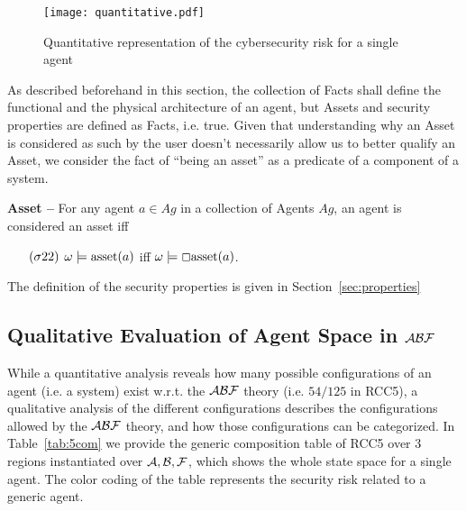 \begin{figure}[t]
	\centering
	\texttt{[image: quantitative.pdf]}
	\caption{Quantitative representation of the cybersecurity risk for a single agent}
	\label{fig:quantitative}
\end{figure}

As described beforehand in this section, the collection of Facts shall define
the functional and the physical architecture of an agent, but Assets and
security properties are defined as Facts, i.e. true. Given that understanding
why an Asset is considered as such by the user doesn't necessarily allow
us to better qualify an Asset, we consider the fact of ``being an asset'' as
a predicate of a component of a system. 

\begin{definition}{\bf Asset --}\label{def:asset}
For any agent $a\in Ag$ in a collection of Agents $Ag$, an agent is considered an asset iff 
	\begin{enumerate}[noitemsep]
		\item[$(\sigma22)$] $\omega\models\text{asset}({a})$ iff
			$\omega\models \Box\text{asset}({a})$.
	\end{enumerate}
\end{definition}

The definition of the security properties is given in Section~\ref{sec:properties}

\subsection{Qualitative Evaluation of Agent Space in $\mathcal{A}\mathcal{B}\mathcal{F}$}\label{sec:agentspace}
While a quantitative analysis reveals how many possible configurations of an
agent (i.e. a system) exist w.r.t. the $\mathcal{A}\mathcal{B}\mathcal{F}$ theory (i.e. $54/125$ in RCC5), a
qualitative analysis of the different configurations describes
the configurations allowed by the $\mathcal{A}\mathcal{B}\mathcal{F}$ theory, and how those configurations can be
categorized.  In Table~\ref{tab:5com} we provide the generic composition table
of RCC5 over 3 regions instantiated over $\mathcal{A},\mathcal{B},\mathcal{F}$, which shows the whole state
space for a single agent. The color coding of the table represents the 
security risk related to a generic agent. 

